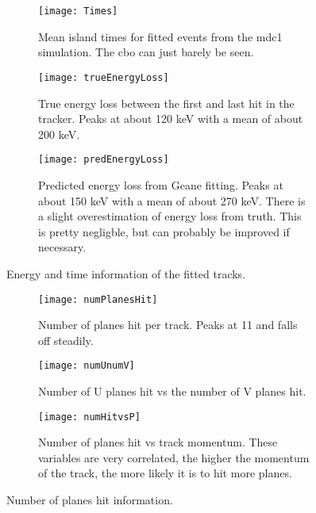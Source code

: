 \begin{figure}
    \centering
    \begin{subfigure}[]{0.65\textwidth}
        \centering
        \texttt{[image: Times]} 
        \caption{Mean island times for fitted events from the mdc1 simulation. The cbo can just barely be seen.}
    \end{subfigure}
    
    \begin{subfigure}[]{0.65\textwidth}
        \centering
        \texttt{[image: trueEnergyLoss]} 
        \caption{True energy loss between the first and last hit in the tracker. Peaks at about 120 keV with a mean of about 200 keV.}
    \end{subfigure}

    \begin{subfigure}[]{0.65\textwidth}
        \centering
        \texttt{[image: predEnergyLoss]} 
        \caption{Predicted energy loss from Geane fitting. Peaks at about 150 keV with a mean of about 270 keV. There is a slight overestimation of energy loss from truth. This is pretty negligble, but can probably be improved if necessary.}
    \end{subfigure}

    \caption{Energy and time information of the fitted tracks.}
\end{figure}



\begin{figure}
    \centering
    \begin{subfigure}[]{0.6\textwidth}
        \centering
        \texttt{[image: numPlanesHit]} 
        \caption{Number of planes hit per track. Peaks at 11 and falls off steadily.}
    \end{subfigure}
    
    \begin{subfigure}[]{0.6\textwidth}
        \centering
        \texttt{[image: numUnumV]} 
        \caption{Number of U planes hit vs the number of V planes hit.}
    \end{subfigure}

    \begin{subfigure}[]{0.6\textwidth}
        \centering
        \texttt{[image: numHitvsP]} 
        \caption{Number of planes hit vs track momentum. These variables are very correlated, the higher the momentum of the track, the more likely it is to hit more planes.}
    \end{subfigure}

    \caption{Number of planes hit information.}
\end{figure}



